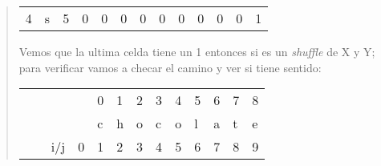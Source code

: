 \begin{quote}
\begin{table}[H]
\begin{tabular}{lllllllllllll}
          4 & s & \multicolumn{1}{l|}{5} & \multicolumn{1}{l|}{0} & \multicolumn{1}{l|}{0} & \multicolumn{1}{l|}{0} & \multicolumn{1}{l|}{0} & \multicolumn{1}{l|}{0} & \multicolumn{1}{l|}{0} & \multicolumn{1}{l|}{0} & \multicolumn{1}{l|}{0} & \multicolumn{1}{l|}{0} & \multicolumn{1}{l|}{1} \\ \cline{4-13} 
          \end{tabular}
    \end{table}

    Vemos que la ultima celda tiene un 1 entonces si es un \textit{shuffle} de X y Y; para verificar vamos a checar el camino y ver si tiene sentido: \vspace{.2cm}
    \begin{table}[H]
        \centering
        \begin{tabular}{lllllllllllll}
            &   &                        &                                                & 0                                              & 1                                              & 2                                              & 3                                              & 4                                              & 5                                              & 6                                              & 7                                              & 8                                              \\
            &   &                        &                                                & c                                              & h                                              & o                                              & c                                              & o                                              & l                                              & a                                              & t                                              & e                                              \\
            &   & i/j                    & 0                                              & 1                                              & 2                                              & 3                                              & 4                                              & 5                                              & 6                                              & 7                                              & 8                                              & 9                                              \\ \cline{4-13} 

\end{tabular}
\end{table}
\end{quote}
